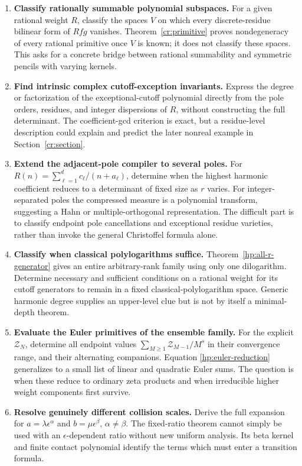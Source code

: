\documentclass[11pt,a4paper]{article}
\theoremstyle{definition}
\theoremstyle{remark}
\numberwithin{equation}{section}
\begin{document}
\begin{enumerate}[label=\textbf{Q\arabic*.},leftmargin=*]
\item \textbf{Classify rationally summable polynomial subspaces.}
For a given rational weight $R$, classify the spaces $V$ on
which every discrete-residue bilinear form of $Rfg$ vanishes.
Theorem~\ref{cr:primitive} proves nondegeneracy of every rational
primitive once $V$ is known; it does not classify these spaces.
This asks for a concrete bridge between rational summability
and symmetric pencils with varying kernels.

\item \textbf{Find intrinsic complex cutoff-exception invariants.}
Express the degree or factorization of the exceptional-cutoff
polynomial directly from the pole orders, residues, and integer
dispersions of $R$, without constructing the full determinant.
The coefficient-gcd criterion is exact, but a residue-level
description could explain and predict the later nonreal example
in Section~\ref{cr:section}.

\item \textbf{Extend the adjacent-pole compiler to several poles.}
For $R(n)=\sum_{\ell=1}^d c_\ell/(n+a_\ell)$, determine when
the highest harmonic coefficient reduces to a determinant of
fixed size as $r$ varies. For integer-separated poles the
compressed measure is a polynomial transform, suggesting a
Hahn or multiple-orthogonal representation. The difficult
part is to classify endpoint pole cancellations and exceptional
residue varieties, rather than invoke the general Christoffel
formula alone.

\item \textbf{Classify when classical polylogarithms suffice.}
Theorem~\ref{hp:all-r-generator} gives an entire arbitrary-rank
family using only one dilogarithm. Determine necessary and
sufficient conditions on a rational weight for its cutoff
generators to remain in a fixed classical-polylogarithm space.
Generic harmonic degree supplies an upper-level clue but is
not by itself a minimal-depth theorem.

\item \textbf{Evaluate the Euler primitives of the ensemble family.}
For the explicit $\mathcal Z_N$, determine all endpoint values
$\sum_{M\ge1}\mathcal Z_{M-1}/M^s$ in their convergence range,
and their alternating companions. Equation
\eqref{hp:euler-reduction} generalizes to a small list of
linear and quadratic Euler sums. The question is when these
reduce to ordinary zeta products and when irreducible higher
weight components first survive.

\item \textbf{Resolve genuinely different collision scales.}
Derive the full expansion for
$a=\lambda\epsilon^\alpha$ and $b=\mu\epsilon^\beta$,
$\alpha\ne\beta$. The fixed-ratio theorem cannot simply be
used with an $\epsilon$-dependent ratio without new uniform
analysis. Its beta kernel and finite contact polynomial
identify the terms which must enter a transition formula.


\end{enumerate}
\end{document}
